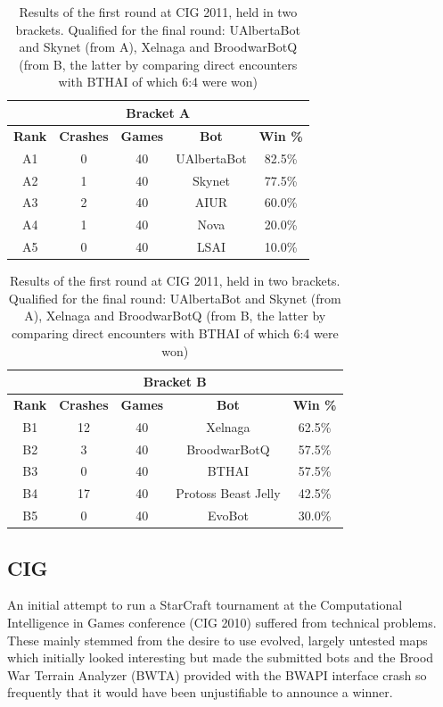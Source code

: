 \documentclass{llncs}
\begin{document}

\begin{table}[!t]
\caption{Results of the first round at CIG 2011, held in two brackets.
Qualified for the final round: UAlbertaBot and Skynet (from A), Xelnaga
and BroodwarBotQ (from B, the latter by comparing direct encounters
with BTHAI of which 6:4 were won)}
\label{tab:cig-first-round}
\centering
\begin{tabular}{|c|c|c|c|c|}
\hline
\multicolumn{5}{|c|}{Bracket A} \\ \hline
{\bfseries Rank} & {\bfseries Crashes} & {\bfseries Games} & {\bfseries Bot} & {\bfseries Win \%} \\
\hline
A1 & 0 &   40 &  UAlbertaBot & 82.5\% \\
A2 & 1 &     40 &  Skynet   &  77.5\% \\
A3 & 2 &   40 &  AIUR   &  60.0\% \\
A4 & 1 &   40 &  Nova   &  20.0\% \\
A5 & 0 &   40 &  LSAI   &  10.0\%\\
\hline
\end{tabular}
\begin{tabular}{|c|c|c|c|c|}
\hline
\multicolumn{5}{|c|}{Bracket B} \\ \hline
{\bfseries Rank} & {\bfseries Crashes} & {\bfseries Games} & {\bfseries Bot} & {\bfseries Win \%} \\
\hline
B1 & 12 &  40 &  Xelnaga &   62.5\%\\
B2 & 3 &   40 &  BroodwarBotQ  &  57.5\%\\
B3 & 0 &   40 &  BTHAI    &  57.5\%\\
B4 & 17 &  40 &  Protoss Beast Jelly  & 42.5\%\\
B5 & 0 &   40 &  EvoBot   &  30.0\%\\
\hline
\end{tabular}
\end{table}

\subsection{CIG}
\label{sec:cig2011}

An initial attempt to run a StarCraft tournament at the Computational
Intelligence in Games conference (CIG 2010) suffered from technical problems.
These mainly stemmed from the desire to use evolved, largely untested
maps which initially looked interesting but made the submitted bots and the Brood War Terrain Analyzer (BWTA) provided with the BWAPI interface crash
so frequently that it would have been unjustifiable to announce a winner.
\end{document}
